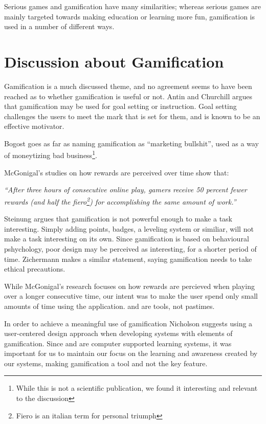 Serious games and gamification have many similarities; whereas serious games are mainly targeted towards making education or learning more fun, gamification is used in a number of different ways. 


\section{Discussion about Gamification}
\label{sec:gamificationdiscussion}

Gamification is a much discussed theme, and no agreement seems to have been reached as to whether gamification is useful or not. 
Antin and Churchill argues that gamification may be used for goal setting or instruction\cite{antin2011badges}. Goal setting challenges the users to meet the mark that is set for them, and is known to be an effective motivator\cite{ling2005using}. 

Bogost goes as far as naming gamification as ``marketing bullshit'', used as a way of moneytizing bad business\cite{gamificationbullshit}\footnote{While this is not a scientific publication, we found it interesting and relevant to the discussion}.

McGonigal's studies on how rewards are perceived over time show that: 

\textit{``After three hours of consecutive online play, gamers receive 50 percent fewer rewards (and half the fiero\footnote{Fiero is an italian term for personal triumph\cite{ekman2007emotions}}) for accomplishing the same amount of work.''}\cite{jane2011reality}

Steinung argues that gamification is not powerful enough to make a task interesting\cite{steinung2012interessante}. Simply adding points, badges, a leveling system or similiar, will not make a task interesting on its own. Since gamification is based on behavioural pshychology, poor design may be perceived as interesting, for a shorter period of time\cite{steinung2012interessante}. Zichermann makes a similar statement, saying gamification needs to take ethical precautions\cite{zichermann2011gamification}.

While McGonigal's research focuses on how rewards are percieved when playing over a longer consecutive time, our intent was to make the user spend only small amounts of time using the application. \ab{} and \app{} are tools, not pastimes.

In order to achieve a meaningful use of gamification Nicholson\cite{nicholson2012user} suggests using a user-centered design approach\cite{usercentereddesign} when developing systems with elements of gamification. Since \ab{} and \app{} are computer supported learning systems\cite{stahl2006computer}, it was important for us to maintain our focus on the learning and awareness created by our systems, making gamification a tool and not the key feature.



